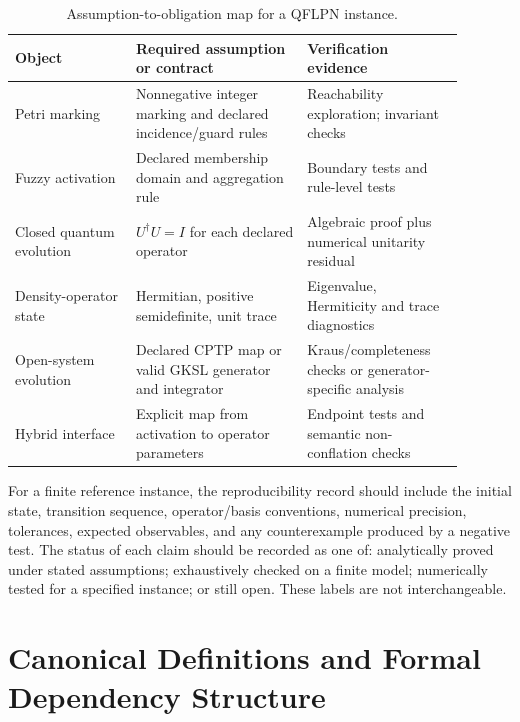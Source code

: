 \documentclass[final,3p,times]{elsarticle}
\begin{document}
\begin{table}[tbp]
\centering
\caption{Assumption-to-obligation map for a QFLPN instance.}
\label{tab:p1-obligations}
\begin{tabular}{p{0.24\linewidth}p{0.34\linewidth}p{0.31\linewidth}}
\toprule
Object & Required assumption or contract & Verification evidence \\
\midrule
Petri marking & Nonnegative integer marking and declared incidence/guard rules & Reachability exploration; invariant checks \\
Fuzzy activation & Declared membership domain and aggregation rule & Boundary tests and rule-level tests \\
Closed quantum evolution & $U^\dagger U=I$ for each declared operator & Algebraic proof plus numerical unitarity residual \\
Density-operator state & Hermitian, positive semidefinite, unit trace & Eigenvalue, Hermiticity and trace diagnostics \\
Open-system evolution & Declared CPTP map or valid GKSL generator and integrator & Kraus/completeness checks or generator-specific analysis \\
Hybrid interface & Explicit map from activation to operator parameters & Endpoint tests and semantic non-conflation checks \\
\bottomrule
\end{tabular}
\end{table}

For a finite reference instance, the reproducibility record should include the initial state, transition sequence, operator/basis conventions, numerical precision, tolerances, expected observables, and any counterexample produced by a negative test. The status of each claim should be recorded as one of: analytically proved under stated assumptions; exhaustively checked on a finite model; numerically tested for a specified instance; or still open. These labels are not interchangeable.

\section{Canonical Definitions and Formal Dependency Structure}
\end{document}
